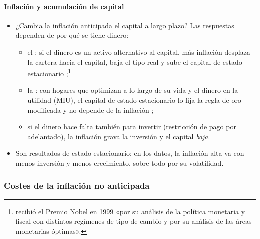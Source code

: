 \documentclass[11pt]{article}
\begin{document}
\paragraph{Inflación y acumulación de capital}

\begin{itemize}
\item ¿Cambia la inflación anticipada el capital a largo plazo? Las respuestas dependen de por qué se tiene dinero:
  \begin{itemize}
  \item el : si el dinero es un activo alternativo al capital, más inflación desplaza la cartera hacia el capital, baja el tipo real y sube el capital de estado estacionario\nocite{Mundell1963Inflation,Tobin1965} ;\footnote{ recibió el Premio Nobel en 1999 «por su análisis de la política monetaria y fiscal con distintos regímenes de tipo de cambio y por su análisis de las áreas monetarias óptimas»\nocite{Nobel1999Mundell}.}
  \item la : con hogares que optimizan a lo largo de su vida y el dinero en la utilidad (MIU), el capital de estado estacionario lo fija la regla de oro modificada y no depende de la inflación\nocite{Sidrauski1967Rational} ;
  \item si el dinero hace falta también para invertir (restricción de pago por adelantado), la inflación grava la inversión y el capital \emph{baja}\nocite{Stockman1981Anticipated}.
  \end{itemize}
\item Son resultados de estado estacionario; en los datos, la inflación alta va con menos inversión y menos crecimiento, sobre todo por su volatilidad.
\end{itemize}

\subsubsection{Costes de la inflación no anticipada}\label{sec:no-anticipada}
\end{document}
